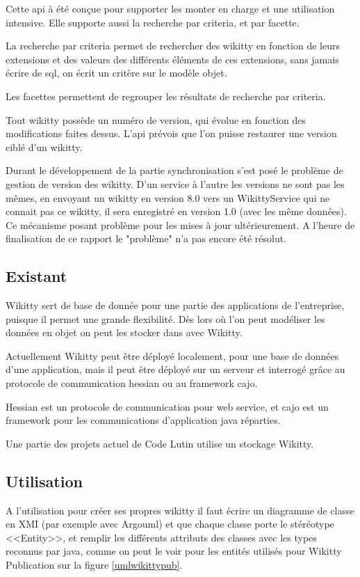 Cette api à été conçue pour supporter les monter en charge et une utilisation
intensive. Elle supporte aussi la recherche par criteria, et par facette.

La recherche par criteria permet de rechercher des wikitty en fonction de leurs
extensions et des valeurs des différents éléments de ces extensions, sans jamais
écrire de sql, on écrit un critère sur le modèle objet. 

Les facettes permettent de regrouper les résultats de recherche par criteria. 

Tout wikitty possède un numéro de version, qui évolue en fonction des
modifications faites dessus. L'api prévois que l'on puisse restaurer une version
ciblé d'un wikitty.

Durant le développement de la partie synchronisation s'est posé le problème de 
gestion de version des wikitty. D'un service à l'autre les versions ne 
sont pas les mêmes, en envoyant un wikitty en version 8.0 vers un WikittyService
qui ne connait pas ce wikitty, il sera enregistré en version 1.0 (avec les
même données). Ce mécanisme posant problème pour les mises à jour ultérieurement. 
A l'heure de finalisation de ce rapport le "problème" n'a pas encore été résolut.

\subsection{Existant}

Wikitty sert de base de donnée pour une partie des applications de l'entreprise,
puisque il permet une grande flexibilité. Dès lors où l'on peut modéliser les
données en objet on peut les stocker dans avec Wikitty.

Actuellement Wikitty peut être déployé localement, pour une base de données
d'une application, mais il peut être déployé sur un serveur et interrogé grâce
au protocole de communication hessian ou au framework cajo.

Hessian est un protocole de communication pour web service, et cajo est un
framework pour les communications d'application java réparties. 

Une partie des projets actuel de Code Lutin utilise un stockage Wikitty.

\subsection{Utilisation}

A l'utilisation pour créer ses propres wikitty il faut écrire un diagramme de
classe en XMI (par exemple avec Argouml) et que chaque classe porte le stéréotype
<<Entity>>, et remplir les différents attributs des classes avec les types
reconnus par java, comme on peut le voir pour les entités utilisés pour Wikitty
Publication sur la figure \ref{umlwikittypub}. 

